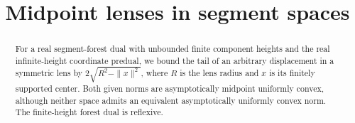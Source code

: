 
\title{Midpoint lenses in segment spaces}

\maketitle
\begin{abstract}
For a real segment-forest dual with unbounded finite component heights
and the real infinite-height coordinate predual, we bound the tail of
an arbitrary displacement in a symmetric lens by
$2\sqrt{R^2-\|x\|^2}$, where $R$ is the lens radius and $x$ is
its finitely supported center. Both given norms are asymptotically
midpoint uniformly convex, although neither space admits an equivalent
asymptotically uniformly convex norm. The finite-height forest dual is
reflexive.
\end{abstract}


























